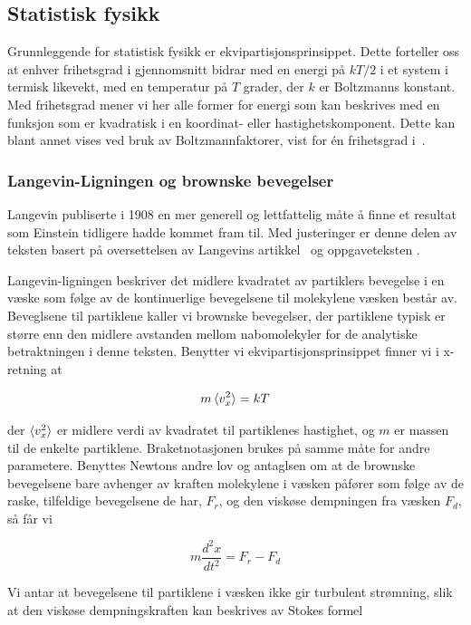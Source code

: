 \documentclass[a4paper,11pt, twocolumn]{article}
\begin{document}
\subsection{Statistisk fysikk}
Grunnleggende for statistisk fysikk er ekvipartisjonsprinsippet. Dette forteller oss at enhver frihetsgrad i gjennomsnitt bidrar med en energi på $kT/2$ i et system i termisk likevekt, med en temperatur på $T$ grader, der $k$ er Boltzmanns konstant. Med frihetsgrad mener vi her alle former for energi som kan beskrives med en funksjon som er kvadratisk i en koordinat- eller hastighetskomponent. Dette kan blant annet vises ved bruk av Boltzmannfaktorer, vist for \'en frihetsgrad i~\cite[sek. 6.3]{Schroeder2000}.

\subsubsection{Langevin-Ligningen og brownske bevegelser}
Langevin publiserte i 1908 en mer generell og lettfattelig måte å finne et resultat som Einstein tidligere hadde kommet fram til. Med justeringer er denne delen av teksten basert på oversettelsen av Langevins artikkel~\cite{LemonsGythiel1997} og oppgaveteksten \cite{brownske}.

Langevin-ligningen beskriver det midlere kvadratet av partiklers bevegelse i en væske som følge av de kontinuerlige bevegelsene til molekylene væsken består av. Beveglsene til partiklene kaller vi brownske bevegelser, der partiklene typisk er større enn den midlere avstanden mellom nabomolekyler for de analytiske betraktningen i denne teksten. Benytter vi ekvipartisjonsprinsippet finner vi i x-retning at  

\begin{equation}
	m\braket{v_x^2} = kT
	\label{eq:kinetic}
\end{equation}

der $\braket{v_x^2}$ er midlere verdi av kvadratet til partiklenes hastighet, og $m$ er massen til de enkelte partiklene. Braketnotasjonen brukes på samme måte for andre parametere. Benyttes Newtons andre lov og antaglsen om at de brownske bevegelsene bare avhenger av kraften molekylene i væsken påfører som følge av de raske, tilfeldige bevegelsene de har, $F_r$, og den viskøse dempningen fra væsken $F_d$, så får vi

\begin{equation}
	m\frac{d^2x}{dt^2}=F_r-F_d
	\label{eq:newton2}
\end{equation}

Vi antar at bevegelsene til partiklene i væsken ikke gir turbulent strømning, slik at den viskøse dempningskraften kan beskrives av Stokes formel
\end{document}
